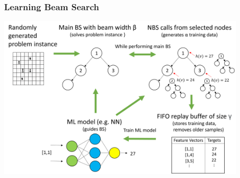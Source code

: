 \documentclass[aspectratio=1610]{beamer}
\newcommand{\important}[1]{{\color{green!60!black}#1}}
\begin{document}
									


	
\begin{frame}
\frametitle{Learning Beam Search \citep{huber-21}}
	\begin{center}
		\includegraphics[height=225pt]{figures/lbsProcedure.png}
	\end{center}
\end{frame}
	
\end{document}
